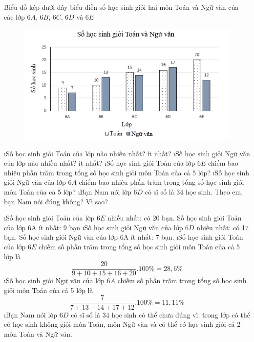 \begin{bt}
	Biểu đồ kép dưới đây biểu diễn số học sinh giỏi hai môn Toán và Ngữ văn của các lớp $6A$, $6B$, $6C$, $6D$ và $6E$
	\begin{figure}[H]
		\centering
		\vspace*{-5pt}
		\captionsetup{labelformat= empty, justification=centering}
		\includegraphics[width=0.5\linewidth]{8}
		\vspace*{-10pt}
	\end{figure}
	\begin{enumerate}[a),leftmargin=*]
		\i Số học sinh giỏi Toán của lớp nào nhiều nhất? ít nhất?
		\i Số học sinh giỏi Ngữ văn của lớp nào nhiều nhất? ít nhất?
		\i Số học sinh giỏi Toán của lớp $6E$ chiếm bao nhiêu phần trăm trong tổng số học sinh giỏi môn Toán của cả 5 lớp?
		\i Số học sinh giỏi Ngữ văn của lớp $6A$ chiếm bao nhiêu phần trăm trong tổng số học sinh giỏi môn Toán của cả 5 lớp?
		\i Bạn Nam nói lớp $6D$ có sĩ số là 34 học sinh. Theo em, bạn Nam nói đúng không? Vì sao?
	\end{enumerate}
	\begin{loigiaichuong40}
		\begin{enumerate}[a),leftmargin=*]
			\i Số học sinh giỏi Toán của lớp $6E$ nhiều nhất: có 20 bạn. Số học sinh giỏi Toán của lớp 6A ít nhất: 9 bạn
			\i Số học sinh giỏi Ngữ văn của lớp $6D$ nhiều nhất: có 17 bạn. Số học sinh giỏi Ngữ văn của lớp 6A ít nhất: 7 bạn.
			\i Số học sinh giỏi Toán của lớp $6E$ chiếm số phần trăm trong tổng số học sinh giỏi môn Toán của cả 5 lớp là
			\[\dfrac{{20}}{{9 + 10 + 15 + 16 + 20}}.100\%  = 28,6\%\]
			\i Số học sinh giỏi Ngữ văn của lớp $6A$ chiếm số phần trăm trong tổng số học sinh giỏi môn Toán của cả 5 lớp là
			\[\dfrac{7}{{7 + 13 + 14 + 17 + 12}}.100\%  = 11,11\%\]
			\i Bạn Nam nói lớp $6D$ có sĩ số là 34 học sinh có thể chưa đúng vì: trong lớp có thể có học sinh không giỏi môn Toán, môn Ngữ văn và có thể có học sinh giỏi cả 2 môn Toán và Ngữ văn.
		\end{enumerate}
	\end{loigiaichuong40}
\end{bt}
